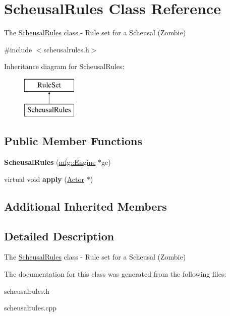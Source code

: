 \hypertarget{class_scheusal_rules}{}\section{Scheusal\+Rules Class Reference}
\label{class_scheusal_rules}


The \hyperlink{class_scheusal_rules}{Scheusal\+Rules} class -\/ Rule set for a Scheusal (Zombie)  




{\ttfamily \#include $<$scheusalrules.\+h$>$}

Inheritance diagram for Scheusal\+Rules\+:\begin{figure}[H]
\begin{center}
\leavevmode
\includegraphics[height=2.000000cm]{class_scheusal_rules}
\end{center}
\end{figure}
\subsection*{Public Member Functions}
\begin{DoxyCompactItemize}
\item 
\mbox{\label{class_scheusal_rules_a69f27ad6633b1e52496b9a6ffffad48d}} 
{\bfseries Scheusal\+Rules} (\hyperlink{classmfg_1_1_engine}{mfg\+::\+Engine} $\ast$ge)
\item 
\mbox{\label{class_scheusal_rules_a1d73e8287bb6c822cd6e6285522dd1bf}} 
virtual void {\bfseries apply} (\hyperlink{class_actor}{Actor} $\ast$)
\end{DoxyCompactItemize}
\subsection*{Additional Inherited Members}


\subsection{Detailed Description}
The \hyperlink{class_scheusal_rules}{Scheusal\+Rules} class -\/ Rule set for a Scheusal (Zombie) 

The documentation for this class was generated from the following files\+:\begin{DoxyCompactItemize}
\item 
scheusalrules.\+h\item 
scheusalrules.\+cpp\end{DoxyCompactItemize}
